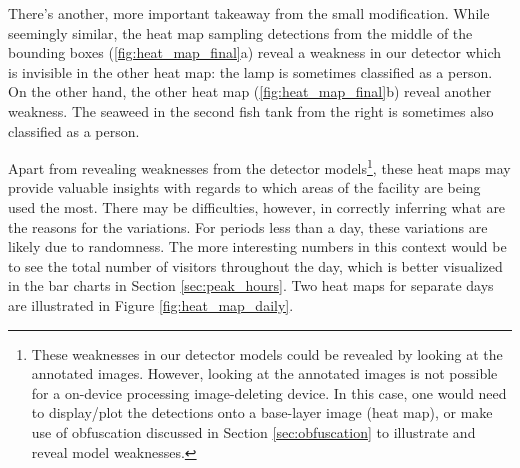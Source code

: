 There's another, more important takeaway from the small modification. While seemingly similar, the heat map sampling detections from the middle of the bounding boxes (\ref{fig:heat_map_final}a) reveal a weakness in our detector which is invisible in the other heat map: the lamp is sometimes classified as a person. On the other hand, the other heat map (\ref{fig:heat_map_final}b) reveal another weakness. The seaweed in the second fish tank from the right is sometimes also classified as a person.   

Apart from revealing weaknesses from the detector models\footnote{These weaknesses in our detector models could be revealed by looking at the annotated images. However, looking at the annotated images is not possible for a on-device processing image-deleting device. In this case, one would need to display/plot the detections onto a base-layer image (heat map), or make use of obfuscation discussed in Section \ref{sec:obfuscation} to illustrate and reveal model weaknesses.}, these heat maps may provide valuable insights with regards to which areas of the facility are being used the most. There may be difficulties, however, in correctly inferring what are the reasons for the variations. For periods less than a day, these variations are likely due to randomness. The more interesting numbers in this context would be to see the total number of visitors throughout the day, which is better visualized in the bar charts in Section \ref{sec:peak_hours}. Two heat maps for separate days are illustrated in Figure \ref{fig:heat_map_daily}.

